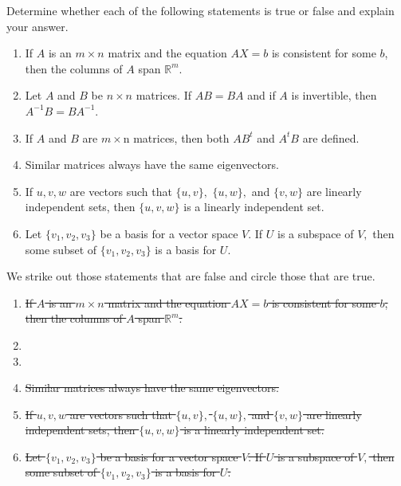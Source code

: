 \documentclass{ximera}
\author{Matthew Carr \& Marty Golubitsky}
\begin{document}

\begin{exercise}\label{mc.exercise14}

Determine whether each of the following statements is true or false and explain your answer.  
\begin{enumerate}[label=(\alph*)]
\item If $A$ is an $m\times n$ matrix and the equation $AX=b$ is consistent for some $b$, then the columns of $A$ span $\mathbb{R}^m$.
\item Let $A$ and $B$ be $n\times n$ matrices. If $AB = BA$ and if $A$ is invertible, then $A^{-1} B= B A^{-1}$. 
\item If $A$ and $B$ are $m\times$n matrices, then both $AB^t$ and $A^t B$ are defined.
\item Similar matrices always have the same eigenvectors.
\item If $u,v,w$ are vectors such that $\{u,v\},$ $\{u,w\},$ and $\{v,w\}$ are linearly independent sets, then $\{u,v,w\}$ is a linearly independent set.
\item Let $\{v_1,v_2,v_3\}$ be a basis for a vector space $V$. If $U$ is a subspace of $V,$ then some subset of $\{v_1,v_2,v_3\}$ is a basis for $U$.
\end{enumerate}
\begin{solution}

\ans 
We strike out those statements that are false and circle those that are true.
\begin{enumerate}[label=(\alph*)]
\item \sout{If $A$ is an $m\times n$ matrix and the equation $AX=b$ is consistent for some $b$, then the columns of $A$ span $\mathbb{R}^m$.}
\item {}
\item {}
\item \sout{Similar matrices always have the same eigenvectors.}
\item \sout{If $u,v,w$ are vectors such that $\{u,v\},$ $\{u,w\},$ and $\{v,w\}$ are linearly independent sets, then $\{u,v,w\}$ is a linearly independent set.}
\item \sout{Let $\{v_1,v_2,v_3\}$ be a basis for a vector space $V$. If $U$ is a subspace of $V,$ then some subset of $\{v_1,v_2,v_3\}$ is a basis for $U$.}
\end{enumerate}


\end{solution}
\end{exercise}
\end{document}
